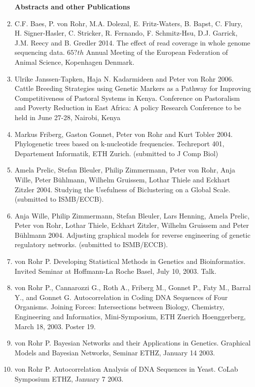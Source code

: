\documentclass[11pt,a4paper]{scrartcl}
\begin{document}
\begin{enumerate}
\vspace{2ex}
\noindent\textbf{Abstracts and other Publications}
\item C.F. Baes, P. von Rohr, M.A. Dolezal, E. Fritz-Waters, B. Bapst, C. Flury, 
  H. Signer-Hasler, C. Stricker, R. Fernando, F. Schmitz-Hsu, D.J. Garrick, 
  J.M. Reecy and B. Gredler 2014.
  The effect of read coverage in whole genome sequencing data.
  $65?{th}$ Annual Meeting of the European Federation of Animal Science, 
  Kopenhagen Denmark.
\item Ulrike Janssen-Tapken, Haja N. Kadarmideen and Peter von Rohr 2006. 
  Cattle Breeding Strategies using Genetic Markers as a Pathway
  for Improving Competitiveness of Pastoral Systems in Kenya.
  Conference on Pastoralism and Poverty Reduction
  in East Africa: A policy Research Conference to be held in June 27-28,
  Nairobi, Kenya
\item Markus Friberg, Gaston Gonnet, Peter von Rohr and Kurt Tobler 2004.
  Phylogenetic trees based on k-nucleotide frequencies.
  Techreport 401, Departement Informatik, ETH Zurich. (submitted to J Comp Biol)
\item Amela Prelic, Stefan Bleuler, Philip Zimmermann, Peter von Rohr, Anja Wille, 
  Peter B\"uhlmann, Wilhelm Gruissem, Lothar Thiele and Eckhart Zitzler 2004. 
  Studying the Usefulness of Biclustering on a Global Scale. (submitted to ISMB/ECCB).
\item Anja Wille, Philip Zimmermann, Stefan Bleuler, Lars Henning, Amela Prelic, 
  Peter von Rohr, Lothar Thiele, Eckhart Zitzler, Wilhelm Gruissem and Peter B\"uhlmann 2004. 
  Adjusting graphical models for reverse engineering of genetic regulatory networks. 
  (submitted to ISMB/ECCB).
\item von Rohr P. Developing Statistical Methods in Genetics and Bioinformatics. Invited 
  Seminar at Hoffmann-La Roche Basel, July 10, 2003. Talk.
\item von Rohr P., Cannarozzi G., Roth A., Friberg M., Gonnet P., Faty M., Barral Y., and Gonnet G. Autocorrelation in Coding DNA Sequences of Four Organisms. Joining Forces: Intersections between Biology, Chemistry, Engineering and Informatics, Mini-Symposium, ETH Zuerich Hoenggerberg, March 18, 2003. Poster 19.
\item von Rohr P. Bayesian Networks and their Applications in Genetics. Graphical Models and Bayesian Networks, Seminar ETHZ, January 14 2003. 
\item von Rohr P. Autocorrelation Analysis of DNA Sequences in Yeast. CoLab Symposium ETHZ, January 7 2003. 

\end{enumerate}
\end{document}
